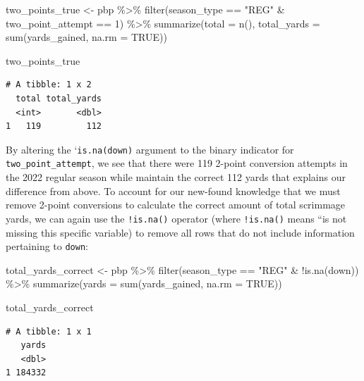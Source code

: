 \documentclass[
  letterpaper,
]{krantz}
\newenvironment{Shaded}{\begin{snugshade}}{\end{snugshade}}
\newcommand{\AttributeTok}[1]{\textcolor[rgb]{0.40,0.45,0.13}{#1}}
\newcommand{\ConstantTok}[1]{\textcolor[rgb]{0.56,0.35,0.01}{#1}}
\newcommand{\DecValTok}[1]{\textcolor[rgb]{0.68,0.00,0.00}{#1}}
\newcommand{\FunctionTok}[1]{\textcolor[rgb]{0.28,0.35,0.67}{#1}}
\newcommand{\NormalTok}[1]{\textcolor[rgb]{0.00,0.23,0.31}{#1}}
\newcommand{\OtherTok}[1]{\textcolor[rgb]{0.00,0.23,0.31}{#1}}
\newcommand{\SpecialCharTok}[1]{\textcolor[rgb]{0.37,0.37,0.37}{#1}}
\newcommand{\StringTok}[1]{\textcolor[rgb]{0.13,0.47,0.30}{#1}}
\begin{document}
\begin{Shaded}
\begin{Highlighting}[]
\NormalTok{two\_points\_true }\OtherTok{\textless{}{-}}\NormalTok{ pbp }\SpecialCharTok{\%\textgreater{}\%}
  \FunctionTok{filter}\NormalTok{(season\_type }\SpecialCharTok{==} \StringTok{"REG"} \SpecialCharTok{\&}\NormalTok{ two\_point\_attempt }\SpecialCharTok{==} \DecValTok{1}\NormalTok{) }\SpecialCharTok{\%\textgreater{}\%}
  \FunctionTok{summarize}\NormalTok{(}\AttributeTok{total =} \FunctionTok{n}\NormalTok{(),}
            \AttributeTok{total\_yards =} \FunctionTok{sum}\NormalTok{(yards\_gained, }\AttributeTok{na.rm =} \ConstantTok{TRUE}\NormalTok{))}

\NormalTok{two\_points\_true}
\end{Highlighting}
\end{Shaded}

\begin{verbatim}
# A tibble: 1 x 2
  total total_yards
  <int>       <dbl>
1   119         112
\end{verbatim}

By altering the `\texttt{is.na(down)} argument to the binary indicator
for \texttt{two\_point\_attempt}, we see that there were 119 2-point
conversion attempts in the 2022 regular season while maintain the
correct 112 yards that explains our difference from above. To account
for our new-found knowledge that we must remove 2-point conversions to
calculate the correct amount of total scrimmage yards, we can again use
the \texttt{!is.na()} operator (where \texttt{!is.na()} means ``is not
missing this specific variable) to remove all rows that do not include
information pertaining to \texttt{down}:

\begin{Shaded}
\begin{Highlighting}[]
\NormalTok{total\_yards\_correct }\OtherTok{\textless{}{-}}\NormalTok{ pbp }\SpecialCharTok{\%\textgreater{}\%}
  \FunctionTok{filter}\NormalTok{(season\_type }\SpecialCharTok{==} \StringTok{"REG"} \SpecialCharTok{\&} \SpecialCharTok{!}\FunctionTok{is.na}\NormalTok{(down)) }\SpecialCharTok{\%\textgreater{}\%}
  \FunctionTok{summarize}\NormalTok{(}\AttributeTok{yards =} \FunctionTok{sum}\NormalTok{(yards\_gained, }\AttributeTok{na.rm =} \ConstantTok{TRUE}\NormalTok{))}

\NormalTok{total\_yards\_correct}
\end{Highlighting}
\end{Shaded}

\begin{verbatim}
# A tibble: 1 x 1
   yards
   <dbl>
1 184332
\end{verbatim}
\end{document}
